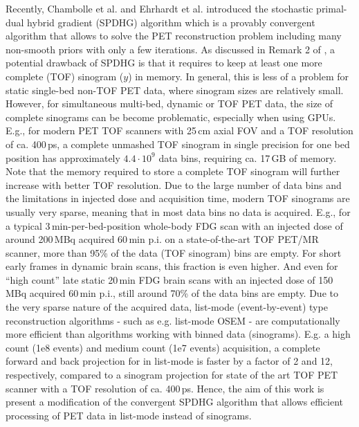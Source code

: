 \documentclass{IEEEtran}
\begin{document}
Recently, Chambolle et al. \cite{Chambolle2018} and  Ehrhardt et al. \cite{Ehrhardt2019} introduced 
the stochastic primal-dual hybrid gradient (SPDHG) algorithm which is a provably convergent algorithm
that allows to solve the PET reconstruction problem including many non-smooth priors with
only a few iterations.
As discussed in Remark 2 of \cite{Ehrhardt2019}, a potential drawback of SPDHG is that it requires
to keep at least one more complete (TOF) sinogram ($y$) in memory. 
In general, this is less of a problem for static single-bed non-TOF PET data, where sinogram sizes
are relatively small.
However, for simultaneous multi-bed, dynamic or TOF PET data, the size of complete sinograms
can be become problematic, especially when using GPUs.
E.g., for modern PET TOF scanners with 25\,cm axial FOV and a TOF resolution of ca. 400\,ps, 
a complete unmashed TOF sinogram in single precision for one bed position 
has approximately $4.4\cdot10^9$ data bins, requiring ca. 17\,GB of memory.
Note that the memory required to store a complete TOF sinogram will further 
increase with better TOF resolution.
Due to the large number of data bins and the limitations in injected dose and acquisition time,
modern TOF sinograms are usually very sparse, meaning that in most data bins no data is
acquired.
E.g., for a typical 3\,min-per-bed-position whole-body FDG scan with an injected dose 
of around 200\,MBq acquired 60\,min p.i. on a state-of-the-art TOF PET/MR scanner, 
more than 95\% of the data (TOF sinogram) bins are empty.
For short early frames in dynamic brain scans, this fraction is even higher.
And even for ``high count'' late static 20\,min FDG brain scans with an injected dose of 150\,MBq
acquired 60\,min p.i., still around 70\% of the data bins are empty.
Due to the very sparse nature of the acquired data, list-mode (event-by-event) type
reconstruction algorithms - such as e.g. list-mode OSEM - are computationally more efficient
than algorithms working with binned data (sinograms).
E.g. a high count (1e8 events) and medium count (1e7 events) acquisition, 
a complete forward and back projection for in list-mode is faster by a factor of 2 and 12,
respectively, compared to a sinogram projection for state of the art TOF PET scanner 
with a TOF resolution of ca. 400\,ps.
Hence, the aim of this work is present a modification of the convergent SPDHG algorithm
that allows efficient processing of PET data in list-mode instead of sinograms.
\end{document}
